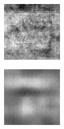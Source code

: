 \begin{figure}[H]
\begin{subfigure}[t]{0.15\textwidth}
    \includegraphics[width=\linewidth]{img/one-trial/prediction_1_lr.png}
  \end{subfigure}
  \begin{subfigure}[t]{0.15\textwidth}
    \centering
    \includegraphics[width=\linewidth]{img/one-trial/prediction_1_cnnv1.png}

\end{subfigure}
\end{figure}
